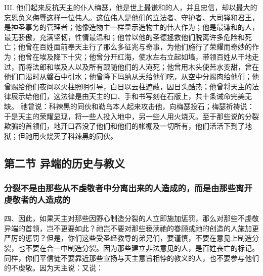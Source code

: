 III. 他们起来反抗天主的仆人梅瑟，他是世上最谦和的人，并且忠信，却以最大的忘恩负义侮辱这样一位伟人。这位伟人是他们的立法者、守护者、大司铎和君王，是神圣事务的管理者；他像造物主一样显示造物主的伟大作为；他是最谦和的人，最无骄傲，充满坚韧，性情最温和；他曾以他的圣德拯救他们脱离许多危险和死亡；他曾在百姓面前奉天主行了那么多征兆与奇事，为他们施行了荣耀而奇妙的作为；他曾在埃及降下十灾；他曾分开红海，使水左右立起如墙，带领百姓从干地走过，而将法郎和埃及人以及所有跟随他们的人淹死；他曾用木头使苦水变甜，曾在他们口渴时从磐石中引水；他曾降下玛纳从天给他们吃，从空中分赐肉给他们；他曾赐给他们夜间以火柱照明引导，白日以云柱遮蔽，因日头酷热；他曾将天主的法律展示给他们，这法律是由天主的口、手和书写刻在石版上，共十条诫命完美无缺。 祂曾说：科辣黑的同伙和勒乌本人起来攻击他，向梅瑟投石；梅瑟祈祷说：于是天主的荣耀显现，将一些人投入地中，另一些人用火烧灭。至于那些说的分裂欺骗的首领们，地开口吞没了他们和他们的帐棚及一切所有，他们活活下到了地狱；但祂用火烧灭了科辣黑的同伙。\par


\subsection{第二节 异端的历史与教义}


\subsubsection{分裂不是由那些从不虔敬者中分离出来的人造成的，而是由那些离开虔敬者的人造成的}

四、因此，如果天主对那些因野心制造分裂的人立即施加惩罚，那么对那些不虔敬异端的首领，岂不更要如此？祂岂不要对那些亵渎祂的眷顾或祂的创造的人施加更严厉的惩罚？但是，你们这些受圣经教导的弟兄们，要谨慎，不要在意见上制造分裂，也不要在合一中制造分裂。因为那些建立非法意见的人，是百姓丧亡的标记。同样，你们平信徒不要靠近那些宣扬与天主意旨相悖的教义的人，也不要参与他们的不虔敬。因为天主说：又说：\par

